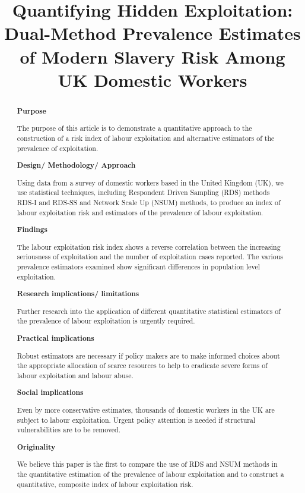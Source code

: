 \documentclass[
  12pt,
  letterpaper,
  DIV=11,
  numbers=noendperiod]{scrartcl}
\title{Quantifying Hidden Exploitation: Dual-Method Prevalence Estimates
of Modern Slavery Risk Among UK Domestic Workers}
\author{}
\date{}
\theoremstyle{plain}
\theoremstyle{definition}
\begin{document}
\maketitle
\begin{abstract}
\textbf{Purpose}

The purpose of this article is to demonstrate a quantitative approach to
the construction of a risk index of labour exploitation and alternative
estimators of the prevalence of exploitation.

\textbf{Design/ Methodology/ Approach}

Using data from a survey of domestic workers based in the United Kingdom
(UK), we use statistical techniques, including Respondent Driven
Sampling (RDS) methods RDS-I and RDS-SS and Network Scale Up (NSUM)
methods, to produce an index of labour exploitation risk and estimators
of the prevalence of labour exploitation.

\textbf{Findings}

The labour exploitation risk index shows a reverse correlation between
the increasing seriousness of exploitation and the number of
exploitation cases reported. The various prevalence estimators examined
show significant differences in population level exploitation.

\textbf{Research implications/ limitations}

Further research into the application of different quantitative
statistical estimators of the prevalence of labour exploitation is
urgently required.

\textbf{Practical implications}

Robust estimators are necessary if policy makers are to make informed
choices about the appropriate allocation of scarce resources to help to
eradicate severe forms of labour exploitation and labour abuse.

\textbf{Social implications}

Even by more conservative estimates, thousands of domestic workers in
the UK are subject to labour exploitation. Urgent policy attention is
needed if structural vulnerabilities are to be removed.

\textbf{Originality}

We believe this paper is the first to compare the use of RDS and NSUM
methods in the quantitative estimation of the prevalence of labour
exploitation and to construct a quantitative, composite index of labour
exploitation risk.
\end{abstract}
\end{document}
